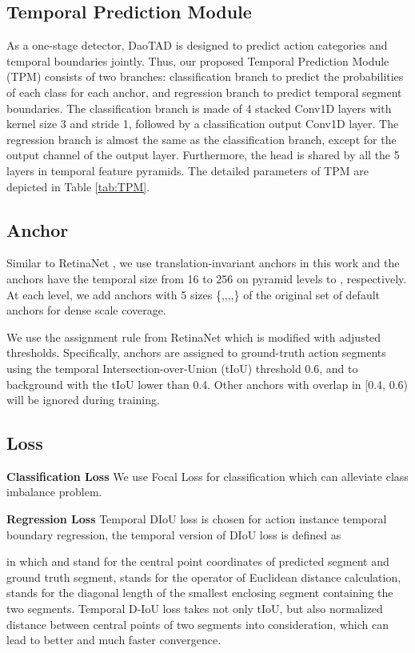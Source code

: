 \documentclass[final]{cvpr}
\begin{document}
\subsection{Temporal Prediction Module}
As a one-stage detector, DaoTAD is designed to predict action categories and temporal boundaries jointly. Thus, our proposed Temporal Prediction Module (TPM) consists of two branches: classification branch to predict the probabilities of each class for each anchor, and regression branch to predict temporal segment boundaries. The classification branch is made of 4 stacked Conv1D layers with kernel size 3 and stride 1, followed by a classification output Conv1D layer. The regression branch is almost the same as the classification branch, except for the output channel of the output layer. Furthermore, the head is shared by all the 5 layers in temporal feature pyramids. The detailed parameters of TPM are depicted in Table \ref{tab:TPM}.

\subsection{Anchor}
Similar to RetinaNet \cite{lin2017focal}, we use translation-invariant anchors in this work and the anchors have the temporal size from 16 to 256 on pyramid levels  to , respectively. At each level, we add anchors with 5 sizes \{,,,,\} of the original set of default anchors for dense scale coverage. 

We use the assignment rule from RetinaNet \cite{lin2017focal} which is modified with adjusted thresholds. Specifically, anchors are assigned to ground-truth action segments using the temporal Intersection-over-Union (tIoU) threshold 0.6, and to background with the tIoU lower than 0.4. Other anchors with overlap in [0.4, 0.6) will be ignored during training.

\subsection{Loss}
\textbf{Classification Loss} We use Focal Loss \cite{lin2017focal} for classification which can alleviate class imbalance problem. 

\textbf{Regression Loss} Temporal DIoU loss is chosen for action instance temporal boundary regression, the temporal version of DIoU loss \cite{zheng2020distance} is defined as 

in which  and  stand for the central point coordinates of predicted segment and ground truth segment,  stands for the operator of Euclidean distance calculation,  stands for the diagonal length of the smallest enclosing segment containing the two segments. Temporal D-IoU loss takes not only tIoU, but also normalized distance between central points of two segments into consideration, which can lead to better and much faster convergence.
\end{document}
